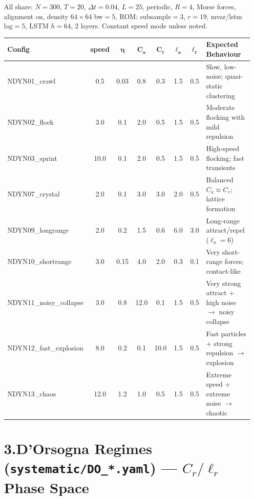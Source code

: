 \documentclass[10pt,landscape]{article}
\begin{document}
All share: $N{=}300$, $T{=}20$, $\Delta t{=}0.04$, $L{=}25$, periodic, $R{=}4$, Morse forces,
alignment on, density $64{\times}64$ bw$=5$, ROM: subsample$=3$, $r{=}19$, mvar/lstm lag$=5$,
LSTM $h{=}64$, 2 layers.  Constant speed mode unless noted.

\begin{center}
\small
\begin{tabular}{l c c c c c c l}
\toprule
\textbf{Config} & \textbf{speed} & $\boldsymbol{\eta}$ & $\boldsymbol{C_a}$ & $\boldsymbol{C_r}$ & $\boldsymbol{\ell_a}$ & $\boldsymbol{\ell_r}$ & \textbf{Expected Behaviour} \\
\midrule
\rowcolor{rowA}
NDYN01\_crawl       & 0.5  & 0.03 & 0.8  & 0.3  & 1.5 & 0.5 & Slow, low-noise; quasi-static clustering \\
NDYN02\_flock       & 3.0  & 0.1  & 2.0  & 0.5  & 1.5 & 0.5 & Moderate flocking with mild repulsion \\
\rowcolor{rowA}
NDYN03\_sprint      & 10.0 & 0.1  & 2.0  & 0.5  & 1.5 & 0.5 & High-speed flocking; fast transients \\
NDYN07\_crystal     & 2.0  & 0.1  & 3.0  & 3.0  & 2.0 & 0.5 & Balanced $C_a{\approx}C_r$; lattice formation \\
\rowcolor{rowA}
NDYN09\_longrange   & 2.0  & 0.2  & 1.5  & 0.6  & 6.0 & 3.0 & Long-range attract/repel ($\ell_a{=}6$) \\
NDYN10\_shortrange  & 3.0  & 0.15 & 4.0  & 2.0  & 0.3 & 0.1 & Very short-range forces; contact-like \\
\rowcolor{rowA}
NDYN11\_noisy\_collapse & 3.0 & 0.8 & 12.0 & 0.1 & 1.5 & 0.5 & Very strong attract + high noise $\to$ noisy collapse \\
NDYN12\_fast\_explosion & 8.0 & 0.2 & 0.1  & 10.0 & 1.5 & 0.5 & Fast particles + strong repulsion $\to$ explosion \\
\rowcolor{rowA}
NDYN13\_chaos        & 12.0 & 1.2  & 1.0  & 0.5  & 1.5 & 0.5 & Extreme speed + extreme noise $\to$ chaotic \\
\bottomrule
\end{tabular}
\end{center}

\section*{3.\quad D'Orsogna Regimes (\texttt{systematic/DO\_*.yaml}) --- $C_r / \ell_r$ Phase Space}
\end{document}
